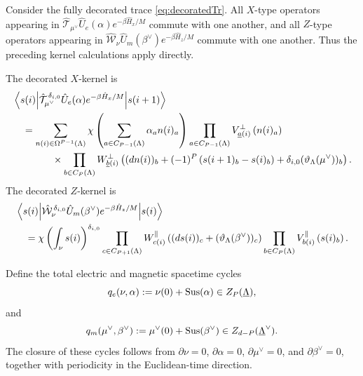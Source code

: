 Consider the fully decorated trace \eqref{eq:decoratedTr}. All \(X\)-type operators appearing in
\(\hat{\mathcal T}_{\mu^\vee}\hat U_e(\alpha)e^{-\beta\hat H_x/M}\) commute with one
another, and all \(Z\)-type operators appearing in
\(\hat{\mathcal W}_\nu\hat U_m(\beta^\vee)e^{-\beta\hat H_z/M}\) commute with one another.
Thus the preceding kernel calculations apply directly.

The decorated \(X\)-kernel is
\begin{align}
	&\left\langle s(i) \middle| 
		\hat{\mathcal T}_{\mu^\vee}^{\,\delta_{i,0}}
		\hat U_e(\alpha)e^{-\beta\hat H_x/M}
	 \middle| s(i+1) \right\rangle
	\nonumber\\
	&\quad=
	\sum_{n(i)\in\Omega^{P-1}(\Lambda)}
	\chi\left(\sum_{a\in C_{P-1}(\Lambda)}\alpha_a n(i)_a\right)
	\prod_{a\in C_{P-1}(\Lambda)}
	V_{\underline a(i)}^{\perp}\left(n(i)_a\right)
	\nonumber\\
	&\qquad\qquad\times
	\prod_{b\in C_P(\Lambda)}
	W_{\underline b(i)}^{\perp}
	\left(
	(dn(i))_b
	+(-1)^P\left(s(i+1)_b-s(i)_b\right)
	+\delta_{i,0}(\vartheta_\Lambda(\mu^\vee))_b
	\right).
	\label{eq:decorated-x-kernel}
\end{align}
The decorated \(Z\)-kernel is
\begin{align}
	&\left\langle s(i) \middle| 
		\hat{\mathcal W}_\nu^{\,\delta_{i,0}}
		\hat U_m(\beta^\vee)e^{-\beta\hat H_z/M}
	 \middle| s(i) \right\rangle
	\nonumber\\
	&\quad=
	\chi\left(\int_\nu s(i)\right)^{\delta_{i,0}}
	\prod_{c\in C_{P+1}(\Lambda)}
	W_{c(i)}^{\parallel}
	\left((ds(i))_c+(\vartheta_\Lambda(\beta^\vee))_c\right)
	\prod_{b\in C_P(\Lambda)}
	V_{b(i)}^{\parallel}\left(s(i)_b\right).
	\label{eq:decorated-z-kernel}
\end{align}

Define the total electric and magnetic spacetime cycles
\begin{equation}
	q_e(\nu,\alpha)
	:=
	\nu(0)+\operatorname{Sus}(\alpha)\in Z_P(\underline\Lambda),
	\label{eq:total-electric-cycle}
\end{equation}
and
\begin{equation}
	q_m(\mu^\vee,\beta^\vee)
	:=
	\mu^\vee(0)+\operatorname{Sus}(\beta^\vee)\in Z_{d-P}(\underline\Lambda^\vee).
	\label{eq:total-magnetic-cycle}
\end{equation}
The closure of these cycles follows from
\(\partial\nu=0\), \(\partial\alpha=0\), \(\partial\mu^\vee=0\), and
\(\partial\beta^\vee=0\), together with periodicity in the Euclidean-time direction.

